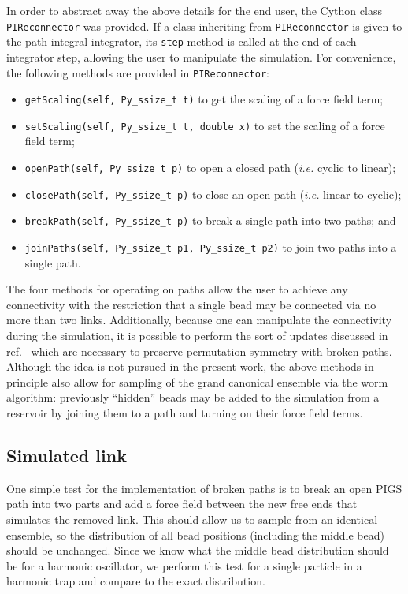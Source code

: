 In order to abstract away the above details for the end user, the Cython class \texttt{PIReconnector} was provided.
If a class inheriting from \texttt{PIReconnector} is given to the path integral integrator, its \texttt{step} method is called at the end of each integrator step, allowing the user to manipulate the simulation.
For convenience, the following methods are provided in \texttt{PIReconnector}:
\begin{itemize}
	\item \texttt{getScaling(self, Py\_ssize\_t t)} to get the scaling of a force field term;
	\item \texttt{setScaling(self, Py\_ssize\_t t, double x)} to set the scaling of a force field term;
	\item \texttt{openPath(self, Py\_ssize\_t p)} to open a closed path (\textit{i.e.} cyclic to linear);
	\item \texttt{closePath(self, Py\_ssize\_t p)} to close an open path (\textit{i.e.} linear to cyclic);
	\item \texttt{breakPath(self, Py\_ssize\_t p)} to break a single path into two paths; and
	\item \texttt{joinPaths(self, Py\_ssize\_t p1, Py\_ssize\_t p2)} to join two paths into a single path.
\end{itemize}
The four methods for operating on paths allow the user to achieve any connectivity with the restriction that a single bead may be connected via no more than two links.
Additionally, because one can manipulate the connectivity during the simulation, it is possible to perform the sort of updates discussed in ref.~\cite{herdman2014path} which are necessary to preserve permutation symmetry with broken paths.
Although the idea is not pursued in the present work, the above methods in principle also allow for sampling of the grand canonical ensemble via the worm algorithm: previously ``hidden'' beads may be added to the simulation from a reservoir by joining them to a path and turning on their force field terms.


\subsection{Simulated link}

\label{subsec:simulated-link}

One simple test for the implementation of broken paths is to break an open PIGS path into two parts and add a force field between the new free ends that simulates the removed link.
This should allow us to sample from an identical ensemble, so the distribution of all bead positions (including the middle bead) should be unchanged.
Since we know what the middle bead distribution should be for a harmonic oscillator, we perform this test for a single particle in a harmonic trap and compare to the exact distribution.

